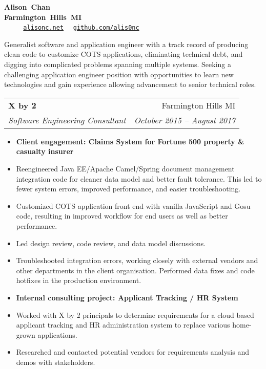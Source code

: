 \documentclass[letterpaper,10pt]{article}
\makeatletter
\newlength{\listsep}
\newcommand{\resitem}[1]{\item #1 \vspace{-2pt}}
\newcommand{\resheading}[1]{\vspace{4pt}
  \parbox{\textwidth}{
      \framebox[\textwidth][l]{
          {\textbf{\sffamily{\large #1}}}
      }
  }
}
\newcommand{\ressubheading}[4]{
\begin{tabular*}{\textwidth}{l@{\cftdotfill{\cftsecdotsep}\extracolsep{\fill}}r}
        \textbf{#1} & #2 \\
        \textit{#3} & \textit{#4} \\
\end{tabular*}\vspace{-6pt}}
\makeatother
\begin{document}
\ifdef{\MONSTER}{\def\PUBLIC{}}{}
\ifdef{\DICE}{\def\PUBLIC{}}{}

\parbox{\textwidth}{\centering
    \textbf{{\Large Alison~Chan}} \\
    \textbf{Farmington~Hills~MI} \\
    ~\textbullet~%
    ~\textbullet~%
    \href{https://alisonc.net/}{\nolinkurl{alisonc.net}}~\textbullet~%
    \href{https://github.com/alis0nc}{\nolinkurl{github.com/alis0nc}}
}
\vspace{6pt}

{\large
Generalist software and application engineer with a track record of producing clean code to customize COTS applications, eliminating technical debt,
and digging into complicated problems spanning multiple systems. 
Seeking a challenging application engineer position with opportunities to learn new technologies and gain experience allowing advancement to senior technical roles.
}

\resheading{Professional Experience}


\ressubheading{X by 2}{Farmington Hills MI}{Software Engineering Consultant}{October 2015 -- August 2017}
\begin{itemize}\itemsep \listsep  \small
    \resitem{{\bf Client engagement: Claims System for Fortune 500 property \& casualty insurer}}
    \resitem{Reengineered Java EE/Apache Camel/Spring document management integration code for cleaner data model 
    	     and better fault tolerance. This led to fewer system errors, improved performance, and easier troubleshooting.}
    \resitem{Customized COTS application front end with vanilla JavaScript and Gosu code, resulting in improved workflow for end users as well as better performance.}
    \resitem{Led design review, code review, and data model discussions.}
    \resitem{Troubleshooted integration errors, working closely with external vendors and other departments in the client 
    	     organisation. Performed data fixes and code hotfixes in the production environment.}
    \resitem{{\bf Internal consulting project: Applicant Tracking / HR System}}
    \resitem{Worked with X by 2 principals to determine requirements for a cloud based applicant tracking
             and HR administration system to replace various home-grown applications.}
    \resitem{Researched and contacted potential vendors for requirements analysis and demos with stakeholders.}
\end{itemize}
\end{document}
